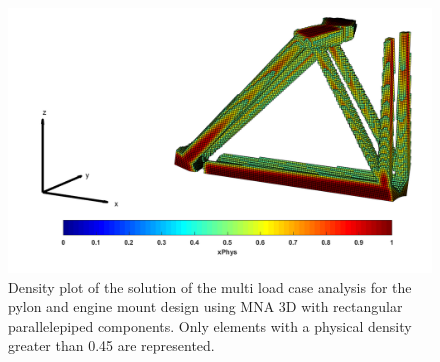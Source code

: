          \begin{figure}[ht]
          \centering
          \includegraphics[width=\textwidth]{images/Ch3/MNA3D_Density_plot_000}
          \caption{Density plot of the solution of the multi load case analysis for the pylon and engine mount design using MNA 3D with rectangular parallelepiped components. Only elements with a physical density greater than 0.45 are represented.}
          \label{fig.3.38}
          \end{figure}
